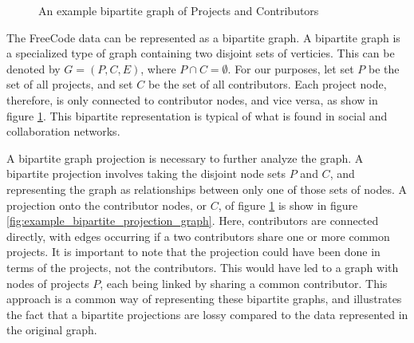 \documentclass{proc}
\begin{document}
\begin{figure}
\centering
{}
\caption{An example bipartite graph of Projects and Contributors}
\label{fig:example_bipartite_graph}
\end{figure}

The FreeCode data can be represented as a bipartite graph. A bipartite graph is a specialized type of graph containing two disjoint sets of verticies. This can be denoted by ${G=(P,C,E)}$, where ${P \cap C = \emptyset}$. For our purposes, let set $P$ be the set of all projects, and set $C$ be the set of all contributors. Each project node, therefore, is only connected to contributor nodes, and vice versa, as show in figure \ref{fig:example_bipartite_graph}. This bipartite representation is typical of what is found in social and collaboration networks\cite{ramasco2004self}.  

A bipartite graph projection is necessary to further analyze the graph. A bipartite projection involves taking the disjoint node sets $P$ and $C$, and representing the graph as relationships between only one of those sets of nodes. A projection onto the contributor nodes, or $C$, of figure \ref{fig:example_bipartite_graph} is show in figure \ref{fig:example_bipartite_projection_graph}. Here, contributors are connected directly, with edges occurring if a two contributors share one or more common projects. It is important to note that the projection could have been done in terms of the projects, not the contributors. This would have led to a graph with nodes of projects $P$, each being linked by sharing a common contributor. This approach is a common way of representing these bipartite graphs\cite{newman2001scientific}, and illustrates the fact that a bipartite projections are lossy compared to the data represented in the original graph\cite{zhou2007bipartite}.\\
\end{document}
